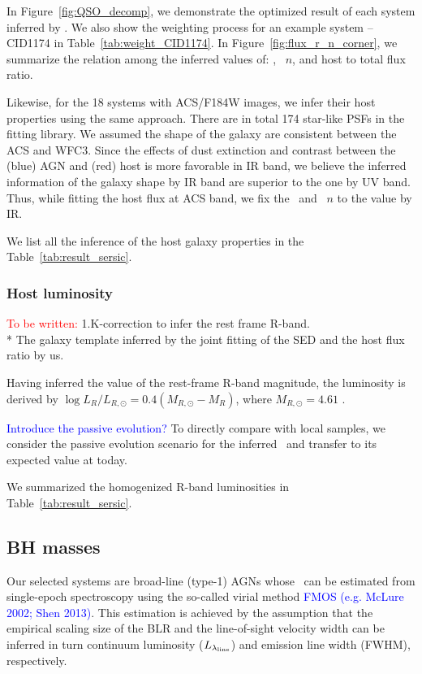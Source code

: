 \documentclass[apj]{emulateapj}
\begin{document}

In Figure~\ref{fig:QSO_decomp}, we demonstrate the optimized result of each system inferred by \lenstronomy. We also show the weighting process for an example system -- CID1174 in Table~\ref{tab:weight_CID1174}. In Figure~\ref{fig:flux_r_n_corner}, we summarize the relation among the inferred values of: \Reff, \sersic\ $n$, and host to total flux ratio. 

Likewise, for the 18 systems with ACS/F184W images, we infer their host properties using the same approach. There are in total 174 star-like PSFs in the fitting library. We assumed the shape of the galaxy are consistent between the ACS and WFC3. Since the effects of dust extinction and contrast between the (blue) AGN and (red) host is more favorable in IR band, we believe the inferred information of the galaxy shape by IR band are superior to the one by UV band. Thus, while fitting the host flux at ACS band, we fix the \Reff\ and \sersic\ $n$ to the value by IR.

We list all the inference of the host galaxy properties in the Table~\ref{tab:result_sersic}.


\subsubsection{Host luminosity}
\textcolor{red}{To be written:}
1.K-correction to infer the rest frame R-band.\\
* The galaxy template inferred by the joint fitting of the SED and the host flux ratio by us.

Having inferred the value of the rest-frame R-band magnitude, the luminosity is derived by $\log L_R/L_{R, \odot} = 0.4 (M_{R, \odot}-M_R)$, where $M_{R, \odot}=4.61$ \citep{Blanton07}.

\textcolor{blue}{Introduce the passive evolution?}
To directly compare with local samples, we consider the passive evolution scenario for the inferred \lhost\ and transfer to its expected value at today.

We summarized the homogenized R-band luminosities
in Table~\ref{tab:result_sersic}.

\subsection{BH masses}
\label{mbh}
Our selected systems are broad-line (type-1) AGNs whose \mbh\ can be estimated from single-epoch spectroscopy using the so-called virial method \textcolor{blue}{FMOS (e.g. McLure 2002; Shen 2013)}. This estimation is achieved by the assumption that the empirical scaling size of the BLR and the line-of-sight velocity width can be inferred in turn continuum luminosity ($L _{\lambda_{\rm line}}$) and emission line width (FWHM), respectively.
\end{document}

